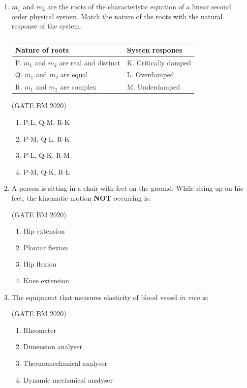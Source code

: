 \documentclass[journal]{IEEEtran}
\begin{document}
\begin{enumerate}
\item $m_1$ and $m_2$ are the roots of the characteristic equation of a linear second order 
physical system. Match the nature of the roots with the natural response of the system. \\[6pt]
\begin{table}[H]
	\centering\normalsize
\begin{tabular}{|l|l|}
	\hline
	Nature of roots &Systen respones \\\hline	
P. $m_1$ and $m_2$ are real and distinct & K. Critically damped \\\hline
Q. $m_1$ and $m_2$ are equal & L. Overdamped \\\hline
R. $m_1$ and $m_2$ are complex & M. Underdamped \\
	\hline
\end{tabular}
\caption{}                                        
\label{tab:Q11}                                   
\end{table}


\hfill(GATE BM 2020)
\begin{multicols}{2}
\begin{enumerate}
\item P-L, Q-M, R-K
\item P-M, Q-L, R-K
\item P-L, Q-K, R-M
\item P-M, Q-K, R-L
\end{enumerate}
\end{multicols}


\item A person is sitting in a chair with feet on the ground. While rising up on his feet, the 
kinematic motion \textbf{NOT} occurring is:


\hfill(GATE BM 2020)
\begin{multicols}{2}
\begin{enumerate}
\item Hip extension
\item Plantar flexion
\item Hip flexion
\item Knee extension
\end{enumerate}
\end{multicols}

\item The equipment that measures elasticity of blood vessel \textit{in vivo} is:


	\hfill(GATE BM 2020)
\begin{enumerate}
\item Rheometer
\item Dimension analyser
\item Thermomechanical analyser
\item Dynamic mechanical analyser
\end{enumerate}


\end{enumerate}
\end{document}
